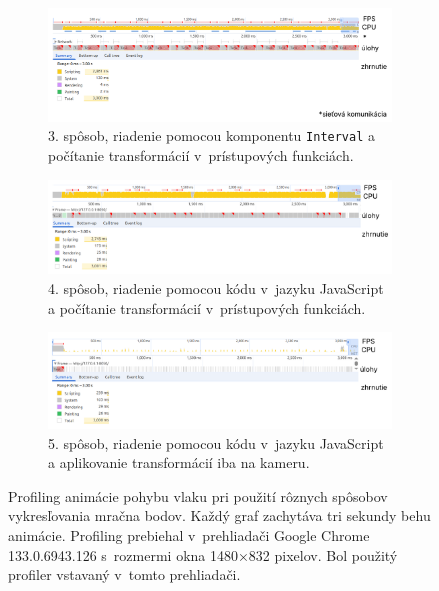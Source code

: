 \begin{figure}
    \centering
    \begin{subfigure}[b]{1\textwidth}
        \centering
        \includegraphics[width=1\linewidth]{text_prace/obrazky-figures/profiling_interval.pdf}
        \caption{3. spôsob, riadenie pomocou komponentu \texttt{Interval} a počítanie transformácií v~prístupových funkciách.}
        \label{fig:profiling_interval}
    \end{subfigure}
    \hfill
    \begin{subfigure}[b]{1\textwidth}
        \centering
        \includegraphics[width=1\linewidth]{text_prace/obrazky-figures/profiling1.pdf}
        \caption{4. spôsob, riadenie pomocou kódu v~jazyku JavaScript a počítanie transformácií v~prístupových funkciách.}
        \label{fig:profiling1}
    \end{subfigure}
    \hfill
    \begin{subfigure}[b]{1\textwidth}
        \centering
        \includegraphics[width=1\linewidth]{text_prace/obrazky-figures/profiling2.pdf}
        \caption{5. spôsob, riadenie pomocou kódu v~jazyku JavaScript a aplikovanie transformácií iba na kameru.}
        \label{fig:profiling2}
    \end{subfigure}
    \caption[Profiling animácie pohybu vlaku pri použití rôznych spôsobov vykresľovania mračna bodov.]{Profiling animácie pohybu vlaku pri použití rôznych spôsobov vykresľovania mračna bodov. Každý graf zachytáva tri sekundy behu animácie. Profiling prebiehal v~prehliadači Google Chrome 133.0.6943.126 s~rozmermi okna 1480×832 pixelov. Bol použitý profiler vstavaný v~tomto prehliadači.}
    \label{fig:profiling}
\end{figure}

